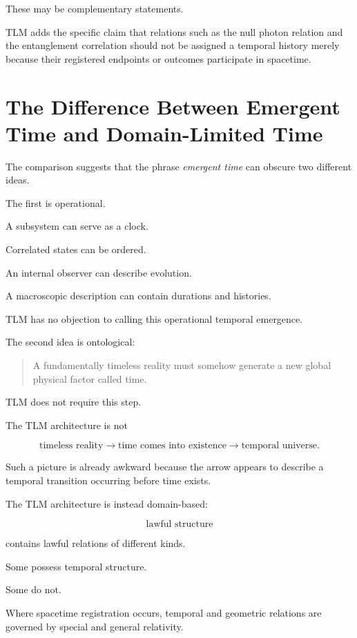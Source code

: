 \documentclass[12pt,onecolumn]{article}
\theoremstyle{plain}
\theoremstyle{definition}
\theoremstyle{remark}
\begin{document}
These may be complementary statements.

TLM adds the specific claim that relations such as the null photon relation
and the entanglement correlation should not be assigned a temporal history
merely because their registered endpoints or outcomes participate in
spacetime.


\section{The Difference Between Emergent Time and Domain-Limited Time}

The comparison suggests that the phrase \emph{emergent time} can obscure
two different ideas.

The first is operational.

A subsystem can serve as a clock.

Correlated states can be ordered.

An internal observer can describe evolution.

A macroscopic description can contain durations and histories.

TLM has no objection to calling this operational temporal emergence.

The second idea is ontological:

\begin{quote}
A fundamentally timeless reality must somehow generate a new global
physical factor called time.
\end{quote}

TLM does not require this step.

The TLM architecture is not

\[
\text{timeless reality}
\longrightarrow
\text{time comes into existence}
\longrightarrow
\text{temporal universe}.
\]

Such a picture is already awkward because the arrow appears to describe a
temporal transition occurring before time exists.

The TLM architecture is instead domain-based:

\[
\boxed{
\text{lawful structure}
}
\]

contains lawful relations of different kinds.

Some possess temporal structure.

Some do not.

Where spacetime registration occurs, temporal and geometric relations are
governed by special and general relativity.
\end{document}
